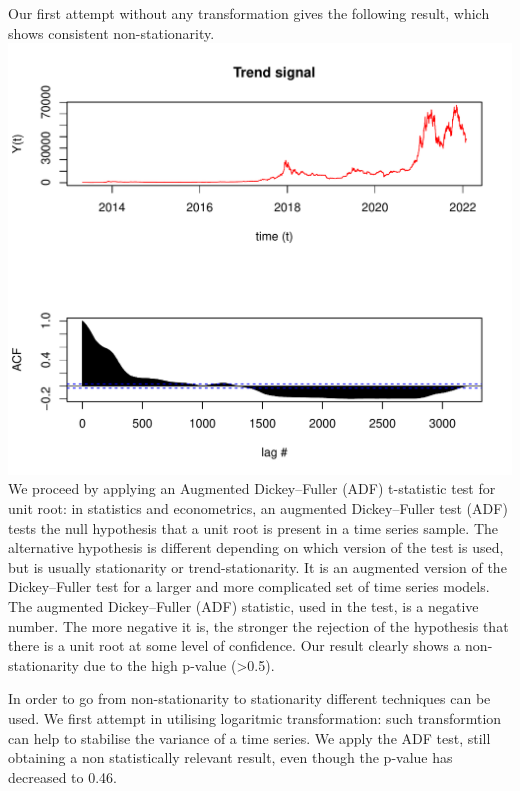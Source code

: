 \documentclass[
]{article}
\begin{document}
Our first attempt without any transformation gives the following result,
which shows consistent non-stationarity.
\includegraphics{Trial1_files/figure-latex/fig14-1.pdf} We proceed by
applying an Augmented Dickey--Fuller (ADF) t-statistic test for unit
root: in statistics and econometrics, an augmented Dickey--Fuller test
(ADF) tests the null hypothesis that a unit root is present in a time
series sample. The alternative hypothesis is different depending on
which version of the test is used, but is usually stationarity or
trend-stationarity. It is an augmented version of the Dickey--Fuller
test for a larger and more complicated set of time series models. The
augmented Dickey--Fuller (ADF) statistic, used in the test, is a
negative number. The more negative it is, the stronger the rejection of
the hypothesis that there is a unit root at some level of confidence.
Our result clearly shows a non-stationarity due to the high p-value
(\textgreater0.5).

In order to go from non-stationarity to stationarity different
techniques can be used. We first attempt in utilising logaritmic
transformation: such transformtion can help to stabilise the variance of
a time series. We apply the ADF test, still obtaining a non
statistically relevant result, even though the p-value has decreased to
0.46.
\end{document}
